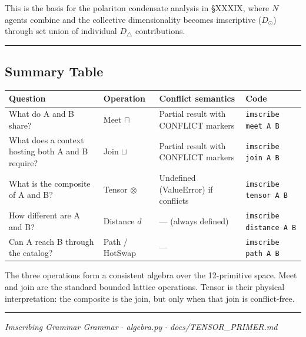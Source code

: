 \documentclass[12pt,a4paper]{article}
\newcommand{\pilcrow}{\S}
\begin{document}
This is the basis for the polariton condensate analysis in \pilcrow{}XXXIX, where $N$ agents combine and the collective dimensionality becomes imscriptive ($D_\odot$) through set union of individual $D_{\triangle}$ contributions.

\begin{center}
\rule{0.5\textwidth}{0.4pt}
\end{center}

\subsection{Summary Table}

\begin{table}[htbp]
\centering
\small
{}
\begin{tabularx}{\textwidth}{>{\centering\arraybackslash}X >{\centering\arraybackslash}X >{\centering\arraybackslash}X >{\centering\arraybackslash}X}
\toprule
\rowcolor{gray!25}\textbf{Question} & \textbf{Operation} & \textbf{Conflict semantics} & \textbf{Code} \\
\midrule
\rowcolors{1}{white}{gray!10}
What do A and B share? & Meet $\sqcap$ & Partial result with CONFLICT markers & \texttt{imscribe meet A B} \\
What does a context hosting both A and B require? & Join $\sqcup$ & Partial result with CONFLICT markers & \texttt{imscribe join A B} \\
What is the composite of A and B? & Tensor $\otimes$ & Undefined (ValueError) if conflicts & \texttt{imscribe tensor A B} \\
How different are A and B? & Distance $d$ & --- (always defined) & \texttt{imscribe distance A B} \\
Can A reach B through the catalog? & Path / HotSwap & --- & \texttt{imscribe path A B} \\
\bottomrule
\end{tabularx}
\end{table}

The three operations form a consistent algebra over the 12-primitive space. Meet and join are the standard bounded lattice operations. Tensor is their physical interpretation: the composite is the join, but only when that join is conflict-free.

\begin{center}
\rule{0.5\textwidth}{0.4pt}
\end{center}

\emph{Imscribing Grammar Grammar $\cdot$ algebra.py $\cdot$ docs/TENSOR\_PRIMER.md}
\end{document}
